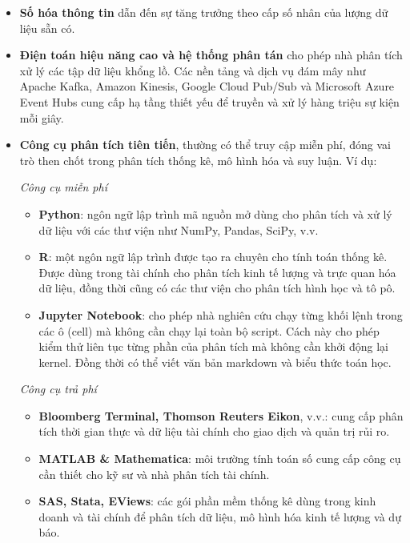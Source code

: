 \begin{itemize}
  \item \textbf{Số hóa thông tin} dẫn đến sự tăng trưởng theo cấp số nhân của lượng dữ liệu sẵn có.
  \item \textbf{Điện toán hiệu năng cao và hệ thống phân tán} cho phép nhà phân tích xử lý các tập dữ liệu khổng lồ. Các nền tảng và dịch vụ đám mây như Apache Kafka, Amazon Kinesis, Google Cloud Pub/Sub và Microsoft Azure Event Hubs cung cấp hạ tầng thiết yếu để truyền và xử lý hàng triệu sự kiện mỗi giây.
  \item \textbf{Công cụ phân tích tiên tiến}, thường có thể truy cập miễn phí, đóng vai trò then chốt trong phân tích thống kê, mô hình hóa và suy luận. Ví dụ:

  \textit{Công cụ miễn phí}
  \begin{itemize}
    \item \textbf{Python}: ngôn ngữ lập trình mã nguồn mở dùng cho phân tích và xử lý dữ liệu với các thư viện như NumPy, Pandas, SciPy, v.v.
    \item \textbf{R}: một ngôn ngữ lập trình được tạo ra chuyên cho tính toán thống kê. Được dùng trong tài chính cho phân tích kinh tế lượng và trực quan hóa dữ liệu, đồng thời cũng có các thư viện cho phân tích hình học và tô pô.
    \item \textbf{Jupyter Notebook}: cho phép nhà nghiên cứu chạy từng khối lệnh trong các ô (cell) mà không cần chạy lại toàn bộ script. Cách này cho phép kiểm thử liên tục từng phần của phân tích mà không cần khởi động lại kernel. Đồng thời có thể viết văn bản markdown và biểu thức toán học.
  \end{itemize}

  \textit{Công cụ trả phí}
  \begin{itemize}
    \item \textbf{Bloomberg Terminal, Thomson Reuters Eikon}, v.v.: cung cấp phân tích thời gian thực và dữ liệu tài chính cho giao dịch và quản trị rủi ro.
    \item \textbf{MATLAB \& Mathematica}: môi trường tính toán số cung cấp công cụ cần thiết cho kỹ sư và nhà phân tích tài chính.
    \item \textbf{SAS, Stata, EViews}: các gói phần mềm thống kê dùng trong kinh doanh và tài chính để phân tích dữ liệu, mô hình hóa kinh tế lượng và dự báo.
  \end{itemize}


\end{itemize}

